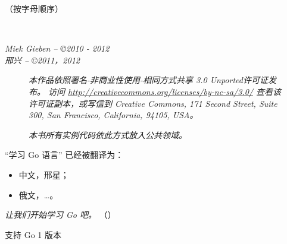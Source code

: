\documentclass[a4paper,twoside,openleft]{blocksbook}
\begin{document}
\begin{cjkc}
\begin{center}
（{\small 按字母顺序}）


\end{center}
\vfill
\begin{center}
    \hspace*{1cm}\\[2.5ex]
    \hspace*{1cm}{\tiny\CcNote{\CcLongnameByNcSa}}
\end{center}
\begin{center}
\hspace*{1cm}\emph{Miek Gieben -- \copyright 2010 - 2012} \\
\hspace*{1cm}\emph{邢兴 -- \copyright 2011，2012}
\end{center}
\vspace{-3em}

\newpage

\thispagestyle{empty}
\begin{figure}[H]
\begin{center}
\emph{
本作品依照署名-非商业性使用-相同方式共享 3.0 Unported许可证发布。
访问 \url{http://creativecommons.org/licenses/by-nc-sa/3.0/}
查看该许可证副本，或写信到
 Creative Commons, 171 Second Street, Suite 300, San Francisco, California, 94105, USA。}    
\vspace{2em}

\emph{本书所有实例代码依此方式放入公共领域。}
\end{center}

\end{figure}

\begin{center}
``学习 Go 语言'' 已经被翻译为：
\begin{itemize}
\item 中文，邢星；
\item 俄文，\ldots。
\end{itemize}
\end{center}

\begin{center}
\vfill
\emph{让我们开始学习 Go 吧。}
（\emph{\version}）

\tiny{支持 Go 1 版本}
\vspace{.2\stockheight}
\end{center}

\clearpage

\tableofcontents*
\listoffigures*
\listofcode* 
\listofex* 
\clearpage


\end{cjkc}
\end{document}
